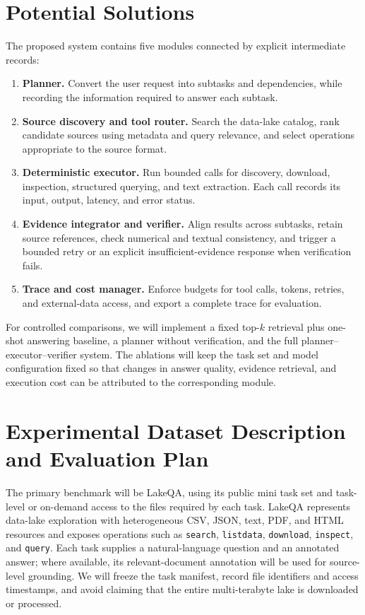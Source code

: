 \documentclass{article}
\begin{document}
\section{Potential Solutions}

The proposed system contains five modules connected by explicit intermediate records:
\begin{enumerate}
    \item \textbf{Planner.} Convert the user request into subtasks and dependencies, while recording the information required to answer each subtask.
    \item \textbf{Source discovery and tool router.} Search the data-lake catalog, rank candidate sources using metadata and query relevance, and select operations appropriate to the source format.
    \item \textbf{Deterministic executor.} Run bounded calls for discovery, download, inspection, structured querying, and text extraction. Each call records its input, output, latency, and error status.
    \item \textbf{Evidence integrator and verifier.} Align results across subtasks, retain source references, check numerical and textual consistency, and trigger a bounded retry or an explicit insufficient-evidence response when verification fails.
    \item \textbf{Trace and cost manager.} Enforce budgets for tool calls, tokens, retries, and external-data access, and export a complete trace for evaluation.
\end{enumerate}

For controlled comparisons, we will implement a fixed top-$k$ retrieval plus one-shot answering baseline, a planner without verification, and the full planner--executor--verifier system. The ablations will keep the task set and model configuration fixed so that changes in answer quality, evidence retrieval, and execution cost can be attributed to the corresponding module.

\section{Experimental Dataset Description and Evaluation Plan}

The primary benchmark will be LakeQA, using its public mini task set and task-level or on-demand access to the files required by each task. LakeQA represents data-lake exploration with heterogeneous CSV, JSON, text, PDF, and HTML resources and exposes operations such as \texttt{search}, \texttt{listdata}, \texttt{download}, \texttt{inspect}, and \texttt{query}. Each task supplies a natural-language question and an annotated answer; where available, its relevant-document annotation will be used for source-level grounding. We will freeze the task manifest, record file identifiers and access timestamps, and avoid claiming that the entire multi-terabyte lake is downloaded or processed.
\end{document}
